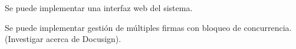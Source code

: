 Se puede implementar una interfaz web del sistema.

Se puede implementar gestión de múltiples firmas con bloqueo de concurrencia. (Investigar acerca de Docusign).


%
%








